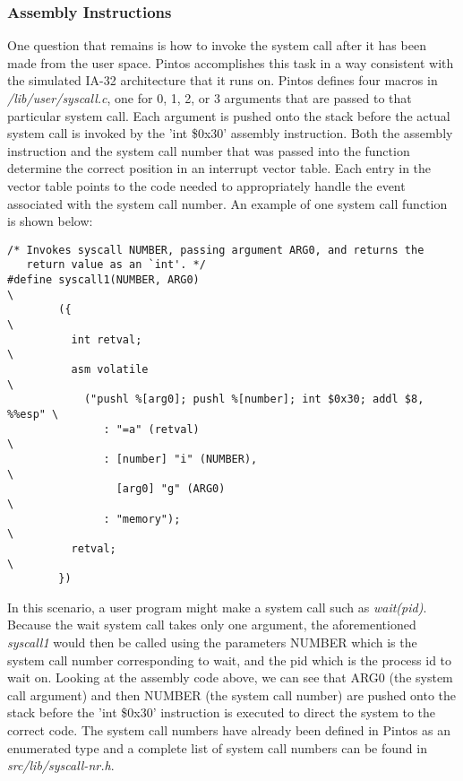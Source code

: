 \documentclass[11pt, letterpaper]{article}
\begin{document}
\subsubsection{Assembly Instructions}
One question that remains is how to invoke the system call after it has been made from the user space. Pintos accomplishes this task 
in a way consistent with the simulated IA-32 architecture that it runs on. Pintos defines four macros in \textit{/lib/user/syscall.c}, one for 0, 1, 2, or 3 arguments that are passed to that particular system 
call. Each argument is pushed onto the stack before the actual system call is invoked by the 'int \$0x30' assembly instruction. Both the 
assembly instruction and the system call number that was passed into the function determine the correct position in an interrupt 
vector table. Each entry in the vector table points to the code needed to appropriately handle the event associated with the system
call number. An example of one system call function is shown below:
\begin{lstlisting}[frame=single,basicstyle=\footnotesize]
/* Invokes syscall NUMBER, passing argument ARG0, and returns the
   return value as an `int'. */
#define syscall1(NUMBER, ARG0)                                           \
        ({                                                               \
          int retval;                                                    \
          asm volatile                                                   \
            ("pushl %[arg0]; pushl %[number]; int $0x30; addl $8, %%esp" \
               : "=a" (retval)                                           \
               : [number] "i" (NUMBER),                                  \
                 [arg0] "g" (ARG0)                                       \
               : "memory");                                              \
          retval;                                                        \
        })
\end{lstlisting}

In this scenario, a user program might make a system call such as \textit{wait(pid)}. Because the wait system call takes only one 
argument, the aforementioned \textit{syscall1} would then be called using the parameters NUMBER which is the system call number 
corresponding to wait, and the pid which is the process id to wait on. Looking at the assembly code above, we can see that ARG0 
(the system call argument) and then NUMBER (the system call number) are pushed onto the stack before the 'int \$0x30' instruction 
is executed to direct the system to the correct code. The system call numbers have already been defined in Pintos as an enumerated 
type and a complete list of system call numbers can be found in \textit{src/lib/syscall-nr.h}.
\end{document}
